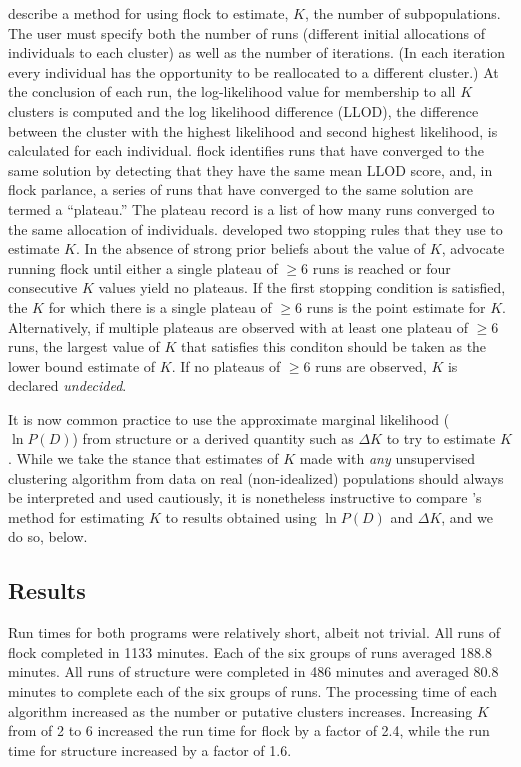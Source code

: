 \citet{Duc&Tur2012} describe a method for using {\sc flock} to estimate, $K$, the number of
subpopulations. The user must specify both the number of runs (different initial allocations of individuals 
to each cluster) as well as the number of iterations. (In each iteration every individual has the opportunity to be reallocated 
to a different cluster.) At the conclusion of each run, the log-likelihood value for membership to all $K$ clusters is computed
and the log likelihood difference (LLOD), the difference between the cluster with the highest likelihood 
and second highest likelihood, is calculated for each individual. {\sc flock} identifies runs that 
have converged to the same solution by detecting that they have the same mean LLOD score, and, in 
{\sc flock} parlance, a series of runs that have converged to the same solution are termed a ``plateau.'' 
The plateau record is a list of how many runs converged to the same allocation
of individuals. 
\citet{Duc&Tur2012} developed two stopping rules that they use to estimate $K$. In the absence of 
strong prior beliefs about the value of $K$, \citet{Duc&Tur2012} advocate running  {\sc flock} until either a single plateau of
$\geq 6$ runs is reached or four consecutive $K$ values yield no plateaus. If the first stopping condition is satisfied,
the $K$ for which there is a single plateau of $\geq 6$ runs is the point estimate for $K$. Alternatively, 
if multiple plateaus are observed with at least one plateau of $\geq 6$ runs, the largest value of $K$ that satisfies 
this conditon should be taken as the lower bound estimate of $K$. If no plateaus of $\geq 6$ runs are observed, $K$
is declared {\em undecided}.  


It is now common practice to use the approximate marginal likelihood ($\ln P(D)$) from {\sc structure}
or a derived quantity such as $\Delta K$ \citep{Evannoetal2005} to try to estimate $K$.
While we take the stance that estimates of $K$ made with {\em any} unsupervised clustering algorithm
from data on real (non-idealized) populations should always be interpreted and used
cautiously, it is nonetheless instructive to compare \citet{Duc&Tur2012}'s method for
estimating $K$ to results obtained using $\ln P(D)$ and $\Delta K$, and we do so, below. 


\subsection*{Results} 
Run times for both programs were relatively short, albeit not trivial. All runs of {\sc flock} 
completed in 1133 minutes. Each of the six groups of runs averaged 188.8 minutes.
All runs of {\sc structure} were completed in 
486 minutes and averaged 80.8 minutes to complete each of the six groups of runs.
The processing time of each algorithm increased as the number or 
putative clusters increases. Increasing
$K$ from of 2 to 6 increased the run time for {\sc flock} by a factor of 2.4, while the run time 
for {\sc structure} increased by a factor of 1.6.

